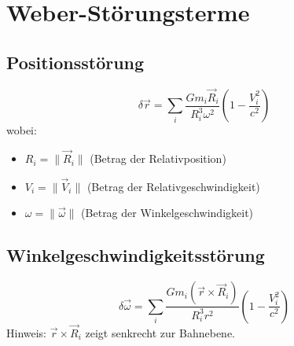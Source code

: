 \section{Weber-Störungsterme}
\subsection{Positionsstörung}
\[
\delta \vec{r} = \sum_i \frac{G m_i \vec{R}_i}{R_i^3 \omega^2} \left(1 - \frac{V_i^2}{c^2}\right)
\]
wobei:
\begin{itemize}
\item $R_i = \|\vec{R}_i\|$ (Betrag der Relativposition)
\item $V_i = \|\vec{V}_i\|$ (Betrag der Relativgeschwindigkeit)
\item $\omega = \|\vec{\omega}\|$ (Betrag der Winkelgeschwindigkeit)
\end{itemize}

\subsection{Winkelgeschwindigkeitsstörung}
\[
\delta \vec{\omega} = \sum_i \frac{G m_i (\vec{r} \times \vec{R}_i)}{R_i^3 r^2} \left(1 - \frac{V_i^2}{c^2}\right)
\]
Hinweis: $\vec{r} \times \vec{R}_i$ zeigt senkrecht zur Bahnebene.